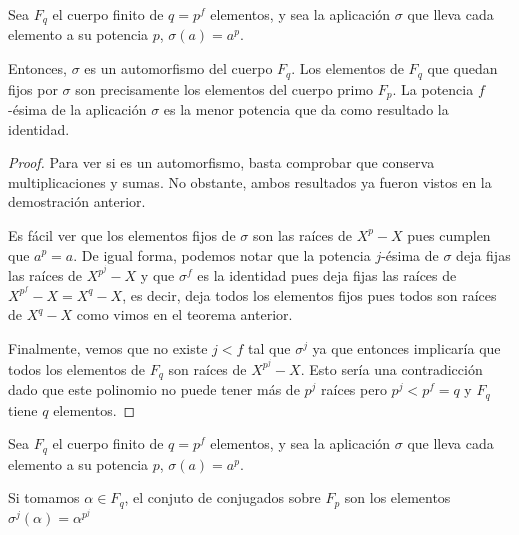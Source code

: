 \begin{thm}
	Sea $F_q$ el cuerpo finito de $q = p^f$ elementos, y sea la aplicación $\sigma$ que lleva cada elemento a su potencia $p$, $\sigma(a) = a^p$.
	
	Entonces, $\sigma$ es un automorfismo del cuerpo $F_q$. Los elementos de $F_q$ que quedan fijos por $\sigma$ son precisamente los elementos del cuerpo primo $F_p$. La potencia $f$-ésima de la aplicación $\sigma$ es la menor potencia que da como resultado la identidad.
\end{thm}

\begin{proof}
	Para ver si es un automorfismo, basta comprobar que conserva multiplicaciones y sumas. No obstante, ambos resultados ya fueron vistos en la demostración anterior.
	
	Es fácil ver que los elementos fijos de $\sigma$ son las raíces de $X^p - X$ pues cumplen que $a^p = a$. De igual forma, podemos notar que la potencia $j$-ésima de $\sigma$ deja fijas las raíces de $X^{p^j} - X$ y que $\sigma^f$ es la identidad pues deja fijas las raíces de $X^{p^f} - X = X^q - X$, es decir, deja todos los elementos fijos pues todos son raíces de $X^q - X$ como vimos en el teorema anterior.
	
	Finalmente, vemos que no existe $j < f$ tal que $\sigma^j$ ya que entonces implicaría que todos los elementos de $F_q$ son raíces de $X^{p^j} - X$. Esto sería una contradicción dado que este polinomio no puede tener más de $p^j$ raíces pero $p^j < p^f = q$ y $F_q$ tiene $q$ elementos. 
\end{proof}

\begin{thm}
	Sea $F_q$ el cuerpo finito de $q = p^f$ elementos, y sea la aplicación $\sigma$ que lleva cada elemento a su potencia $p$, $\sigma(a) = a^p$.
	
	Si tomamos $\alpha \in F_q$, el conjuto de conjugados sobre $F_p$ son los elementos $\sigma^j(\alpha) = \alpha^{p^j}$
\end{thm}

